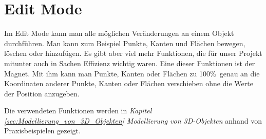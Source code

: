 \section{Edit Mode}
Im Edit Mode kann man alle möglichen Veränderungen an einem Objekt durchführen. Man kann zum Beispiel Punkte, Kanten und Flächen bewegen, löschen oder hinzufügen.
Es gibt aber viel mehr Funktionen, die für unser Projekt mitunter auch in Sachen Effizienz wichtig waren. Eine dieser Funktionen ist der Magnet. Mit ihm kann man Punkte, Kanten oder Flächen zu 100\%\ genau an
die Koordinaten anderer Punkte, Kanten oder Flächen verschieben ohne die Werte der Position anzugeben.

Die verwendeten Funktionen werden in \textit{Kapitel \ref{sec:Modellierung_von_3D_Objekten} \dq Modellierung von 3D-Objekten\dq} anhand von
Praxisbeispielen gezeigt.
